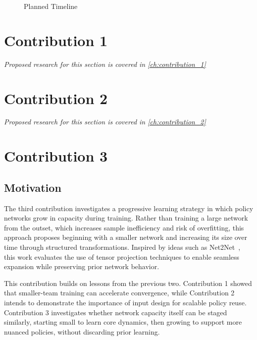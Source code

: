 \begin{figure}[htbp]
\begin{center}
\begin{ganttchart}
    \end{ganttchart}
    \end{center}
    \caption{Planned Timeline}
    \label{fig:timeline}
\end{figure}


\section{Contribution 1}

\emph{Proposed research for this section is covered in \cref{ch:contribution_1}}

\section{Contribution 2}

\emph{Proposed research for this section is covered in \cref{ch:contribution_2}}


\section{Contribution 3}


\subsection{Motivation}
The third contribution investigates a progressive learning strategy in which policy 
networks grow in capacity during training. Rather than training a large network 
from the outset, which increases sample inefficiency and risk of overfitting, 
this approach proposes beginning with a smaller network and increasing its size over 
time through structured transformations. Inspired by ideas such as Net2Net~\cite{chen2016}, 
this work evaluates the use of tensor projection techniques to enable seamless 
expansion while preserving prior network behavior.

This contribution builds on lessons from the previous two. Contribution 1 
showed that smaller-team training can accelerate convergence, while Contribution 2 
intends to demonstrate the importance of input design for scalable policy reuse. 
Contribution 3 investigates whether network capacity itself can be staged similarly,
starting small to learn core dynamics, then growing to support more nuanced policies,
without discarding prior learning.

